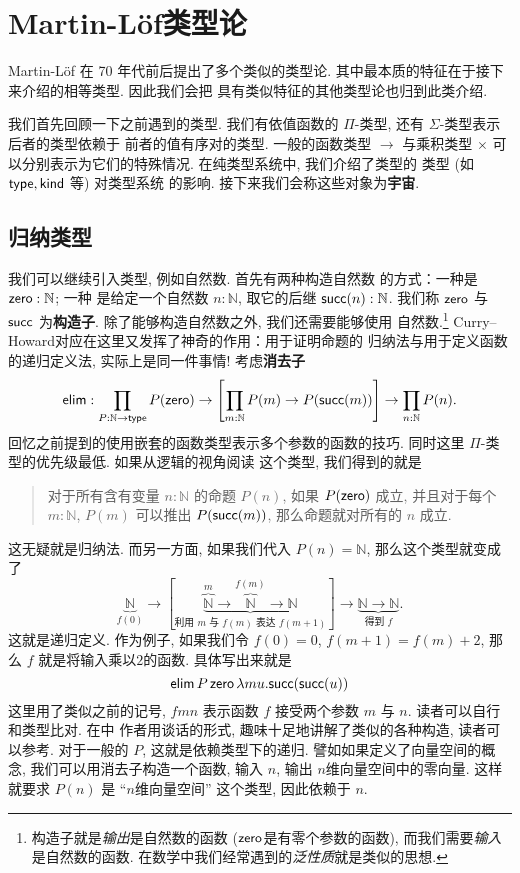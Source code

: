 \chapter{Martin-L\"of类型论}\label{martinlof}

Martin-L\"of 在 70 年代前后提出了多个类似的类型论.
其中最本质的特征在于接下来介绍的相等类型. 因此我们会把
具有类似特征的其他类型论也归到此类介绍.

我们首先回顾一下之前遇到的类型. 我们有依值函数的
\(\Pi\)-类型, 还有 \(\Sigma\)-类型表示后者的类型依赖于
前者的值有序对的类型. 一般的函数类型 \(\to\) 与乘积类型
\(\times\) 可以分别表示为它们的特殊情况.
在纯类型系统中, 我们介绍了类型的
类型 (如 \(\textsf{type}, \textsf{kind}\) 等) 对类型系统
的影响. 接下来我们会称这些对象为\textbf{宇宙}.

\section{归纳类型}

我们可以继续引入类型, 例如自然数. 首先有两种构造自然数
的方式：一种是 \(\textsf{zero} : \mathbb N\); 一种
是给定一个自然数 \(n : \mathbb N\), 取它的后继
\(\textsf{succ}(n) : \mathbb N\). 我们称
\(\textsf{zero}\) 与 \(\textsf{succ}\) 为\textbf{构造子}.
除了能够构造自然数之外, 我们还需要能够使用
自然数.\footnote{构造子就是\emph{输出}是自然数的函数
(\(\textsf{zero}\)是有零个参数的函数), 而我们需要\emph{输入}是自然数的函数.
在数学中我们经常遇到的\emph{泛性质}就是类似的思想.}
Curry--Howard对应在这里又发挥了神奇的作用：用于证明命题的
归纳法与用于定义函数的递归定义法, 实际上是同一件事情!
考虑\textbf{消去子}
\[\textsf{elim} :
\prod_{P : \mathbb N \to \textsf{type}}
P(\textsf{zero}) \to
\left[\prod_{m : \mathbb N} P(m) \to P(\textsf{succ}(m))\right]
\to \prod_{n : \mathbb N} P(n).\]
回忆之前提到的使用嵌套的函数类型表示多个参数的函数的技巧.
同时这里 \(\Pi\)-类型的优先级最低. 如果从逻辑的视角阅读
这个类型, 我们得到的就是
\begin{quotation}
对于所有含有变量 \(n : \mathbb N\) 的命题 \(P(n)\),
如果 \(P(\textsf{zero})\) 成立, 并且对于每个
\(m : \mathbb N\), \(P(m)\) 可以推出 \(P(\textsf{succ}(m))\),
那么命题就对所有的 \(n\) 成立.
\end{quotation}
这无疑就是归纳法. 而另一方面, 如果我们代入 \(P(n) = \mathbb N\),
那么这个类型就变成了
\[\underbrace{\mathbb N}_{f(0)} \to
[\underbrace{\overbrace{\mathbb N}^{m} \to \overbrace{\mathbb N}^{f(m)} \to \mathbb N}
_{\text{利用 \(m\) 与 \(f(m)\) 表达 \(f(m+1)\)}}] \to
\underbrace{\mathbb N \to \mathbb N}_{\text{得到 \(f\)}}.\]
这就是递归定义. 作为例子, 如果我们令
\(f(0) = 0\), \(f(m+1) = f(m)+2\), 那么
\(f\) 就是将输入乘以\(2\)的函数. 具体写出来就是
\[\textsf{elim}\, P\,\textsf{zero}\,\lambda m u. \textsf{succ}(\textsf{succ}(u))\]
这里用了类似之前的记号, \(fmn\) 表示函数 \(f\) 接受两个参数 \(m\) 与 \(n\).
读者可以自行和类型比对. 在\cite{friedman:2018:typer}中
作者用谈话的形式, 趣味十足地讲解了类似的各种构造,
读者可以参考. 对于一般的 \(P\), 这就是依赖类型下的递归.
譬如如果定义了向量空间的概念, 我们可以用消去子构造一个函数,
输入 \(n\), 输出 \(n\)维向量空间中的零向量. 这样就要求
\(P(n)\) 是 “\(n\)维向量空间” 这个类型, 因此依赖于 \(n\).

